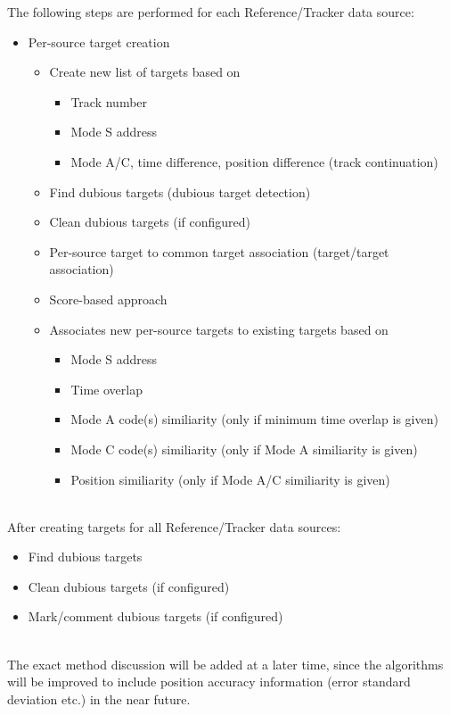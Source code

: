 The following steps are performed for each Reference/Tracker data source:
\begin{itemize}
\item Per-source target creation
\begin{itemize}
\item Create new list of targets based on
\begin{itemize}
\item Track number
\item Mode S address
\item Mode A/C, time difference, position difference (track continuation)
\end{itemize}
\item Find dubious targets (dubious target detection)
\item Clean dubious targets (if configured)
\end{itemize}
\begin{itemize}
\item Per-source target to common target association (target/target association)
\item Score-based approach
\item Associates new per-source targets to existing targets based on
\begin{itemize}
\item Mode S address
\item Time overlap
\item Mode A code(s) similiarity (only if minimum time overlap is given)
\item Mode C code(s) similiarity (only if Mode A similiarity is given)
\item Position similiarity (only if Mode A/C similiarity is given)
\end{itemize}
\end{itemize}
\end{itemize}
\ \\

After creating targets for all Reference/Tracker data sources:
\begin{itemize}
\item Find dubious targets
\item Clean dubious targets (if configured)
\item Mark/comment dubious targets (if configured)
\end{itemize}
\ \\

The exact method discussion will be added at a later time, since the algorithms will be improved to include position accuracy information (error standard deviation etc.) in the near future. \\

